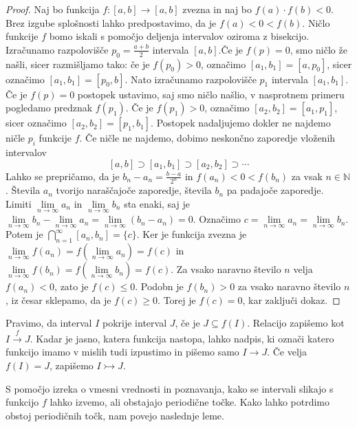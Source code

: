 \documentclass[mat2]{fmfdelo}
\newcommand{\N}{\mathbb N}
\begin{document}
\begin{proof}
Naj bo funkcija $f:[a, b] \to [a, b]$ zvezna in naj bo $f(a)\cdot f(b) < 0$. Brez izgube splošnosti lahko predpostavimo, da je $f(a) < 0 < f(b)$. Ničlo funkcije $f$ bomo iskali s pomočjo deljenja intervalov oziroma z bisekcijo. Izračunamo razpolovišče $p_0=\frac{a+b}{2}$ intervala $[a, b]$.Če je $f(p)=0$, smo ničlo že našli, sicer razmišljamo tako: če je $f(p_0) >0$, označimo $[a_1, b_1] =  [a, p_0]$, sicer označimo $[a_1, b_1] =  [p_0, b]$. Nato izračunamo razpolovišče $p_1$ intervala $[a_1, b_1]$. Če je $f(p)=0$ postopek ustavimo, saj smo ničlo našlio, v nasprotnem primeru pogledamo predznak $f(p_1)$. Če je $f(p_1) >0$, označimo $[a_2, b_2] =  [a_1, p_1]$, sicer označimo $[a_2, b_2] =  [p_1, b_1]$. Postopek nadaljujemo dokler ne najdemo ničle $p_i$ funkcije $f$. Če ničle ne najdemo, dobimo neskončno zaporedje vloženih intervalov 
$$ [a, b] \supset [a_1, b_1] \supset [a_2, b_2] \supset \cdots$$
Lahko se prepričamo, da je $b_n - a_n = \frac{b-a}{2^n}$ in $f(a_n)<0<f(b_n)$ za vsak $n\in \N$. Števila $a_n$ tvorijo naraščajoče zaporedje, števila $b_n$ pa padajoče zaporedje.  Limiti $\lim\limits_{n \to \infty} a_n$ in $\lim\limits_{n \to \infty} b_n$ sta enaki, saj je 
$\lim\limits_{n \to \infty} b_n - \lim\limits_{n \to \infty} a_n = \lim\limits_{n \to \infty} (b_n - a_n) =0$. Označimo $c = \lim\limits_{n \to \infty} a_n = \lim\limits_{n \to \infty} b_n$. Potem je 
$\bigcap\limits_{n=1}^{\infty} [a_n, b_n] = \{c\}$. 
Ker je funkcija zvezna je 
$\lim\limits_{n \to \infty} f(a_n) = f(\lim\limits_{n \to \infty} a_n) = f(c)$
in 
$\lim\limits_{n \to \infty} f(b_n) = f(\lim\limits_{n \to \infty} b_n) = f(c)$.
Za vsako naravno število $n$ velja $f(a_n) <0$, zato je $f(c) \leq 0$. Podobn je $f(b_n) > 0$ za vsako naravno število $n$, iz česar sklepamo, da je $f(c) \geq 0$. Torej je $f(c) = 0$, kar zaključi dokaz.
\end{proof}

\begin{definicija}\label{def:pokritja}
Pravimo, da interval $I$ pokrije interval $J$, če je $J \subseteq f(I)$. Relacijo zapišemo kot $I \xrightarrow{f} J$. Kadar je jasno, katera funkcija nastopa, lahko nadpis, ki označi katero funkcijo imamo v mislih tudi izpustimo in pišemo samo $I \to J$. Če velja $f(I) =J$, zapišemo $I \rightarrowtail J$.
\end{definicija}

S pomočjo izreka o vmesni vrednosti in poznavanja, kako se intervali slikajo s funkcijo $f$ lahko izvemo, ali obstajajo periodične točke. Kako lahko potrdimo obstoj periodičnih točk, nam povejo naslednje leme.
\end{document}
